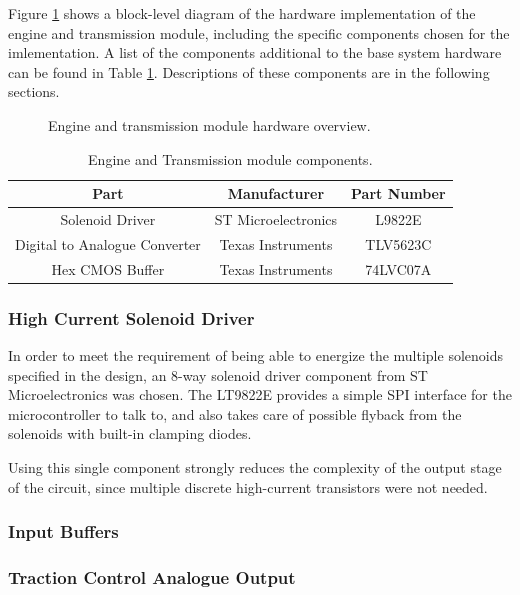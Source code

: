 Figure \ref{fig:engine_system_overview} shows a block-level diagram of the hardware implementation of the engine and transmission module, including the specific components chosen for the imlementation. A list of the components additional to the base system hardware can be found in Table \ref{tab:engine_transmission_module_components}. Descriptions of these components are in the following sections.

\begin{figure}[H]
\centering

\caption{Engine and transmission module hardware overview.}
\label{fig:engine_system_overview}
\end{figure}

\begin{table}
  \caption{Engine and Transmission module components.\label{tab:engine_transmission_module_components}}
  \centering
  \begin{tabular}{|c|c|c|}
    \hline 
    Part & Manufacturer & Part Number\tabularnewline 
    \hline \hline
    Solenoid Driver & ST Microelectronics & L9822E \tabularnewline
    \hline
    Digital to Analogue Converter & Texas Instruments & TLV5623C \tabularnewline
    \hline
    Hex CMOS Buffer & Texas Instruments & 74LVC07A \tabularnewline
    \hline
  \end{tabular}
\end{table}


\subsubsection{High Current Solenoid Driver}

In order to meet the requirement of being able to energize the multiple solenoids specified in the design, an 8-way solenoid driver component from ST Microelectronics was chosen. The LT9822E provides a simple SPI interface for the microcontroller to talk to, and also takes care of possible flyback from the solenoids with built-in clamping diodes.

Using this single component strongly reduces the complexity of the output stage of the circuit, since multiple discrete high-current transistors were not needed.

\subsubsection{Input Buffers}


\subsubsection{Traction Control Analogue Output}

